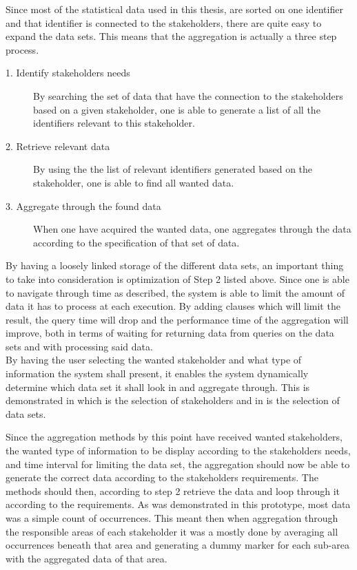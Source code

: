 Since most of the statistical data used in this thesis, are sorted on one 
identifier and that identifier is connected to the stakeholders, there are 
quite easy to expand the data sets. This means that the aggregation is actually
a three step process.

\begin{description}
	\item [1. Identify stakeholders needs] By searching the set of data that 
	have the connection to the stakeholders based on a given stakeholder, one 
	is able to generate a list of all the identifiers relevant to this 
	stakeholder.
	\item [2. Retrieve relevant data] By using the the list of relevant
	identifiers generated based on the stakeholder, one is able to find all 
	wanted data.
	\item [3. Aggregate through the found data] When one have acquired the 
	wanted data, one aggregates through the data according to the 
	specification of that set of data.
\end{description}


By having a loosely linked storage of the different data sets, an important
thing to take into consideration is optimization of Step 2 listed above. Since
one is able to navigate through time as described, the system is able to limit
the amount of data it has to process at each execution. By adding clauses which
will limit the result, the query time will drop and the performance time of the
aggregation will improve, both in terms of waiting for returning data from
queries on the data sets and with processing said data.\\

By having the user selecting the wanted stakeholder and what type of
information the system shall present, it enables the system dynamically
determine which data set it shall look in and aggregate through. This is
demonstrated in  which is the
selection of stakeholders and in  is the selection of data
sets.

Since the aggregation methods by this point have received wanted stakeholders,
the wanted type of information to be display according to the stakeholders
needs, and time interval for limiting the data set, the aggregation should now
be able to generate the correct data according to the stakeholders
requirements. The methods should then, according to step 2 retrieve the data
and loop through it according to the requirements. As was demonstrated in this 
prototype, most data was a simple count of occurrences. This meant then when
aggregation through the responsible areas of each stakeholder it was a mostly
done by averaging all occurrences beneath that area and generating a dummy
marker for each sub-area with the aggregated data of that area.


